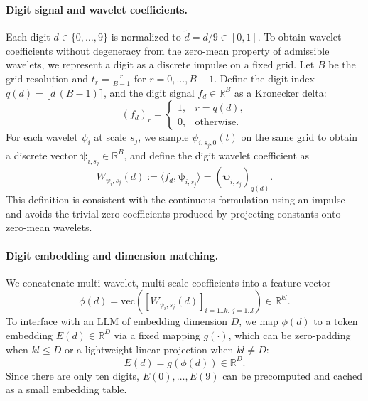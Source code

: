 \documentclass{article}
\begin{document}
\paragraph{Digit signal and wavelet coefficients.}
Each digit $d\in\{0,\ldots,9\}$ is normalized to $\tilde d = d/9 \in [0,1]$. To obtain wavelet coefficients without degeneracy from the zero-mean property of admissible wavelets, we represent a digit as a discrete impulse on a fixed grid.
Let $B$ be the grid resolution and $t_r=\frac{r}{B-1}$ for $r=0,\ldots,B-1$. Define the digit index $q(d)=\lfloor \tilde d\,(B-1) \rceil$, and the digit signal $f_d\in\mathbb{R}^{B}$ as a Kronecker delta:
\begin{equation}
(f_d)_r =
\begin{cases}
1, & r=q(d),\\
0, & \text{otherwise}.
\end{cases}
\label{eq:digit_onehot_main}
\end{equation}
For each wavelet $\psi_i$ at scale $s_j$, we sample $\psi_{i,s_j,0}(t)$ on the same grid to obtain a discrete vector $\boldsymbol{\psi}_{i,s_j}\in\mathbb{R}^{B}$, and define the digit wavelet coefficient as
\begin{equation}
W_{\psi_i,s_j}(d) := \langle f_d, \boldsymbol{\psi}_{i,s_j} \rangle = (\boldsymbol{\psi}_{i,s_j})_{q(d)}.
\label{eq:digit_wavelet_coeff_main}
\end{equation}
This definition is consistent with the continuous formulation using an impulse and avoids the trivial zero coefficients produced by projecting constants onto zero-mean wavelets.

\paragraph{Digit embedding and dimension matching.}
We concatenate multi-wavelet, multi-scale coefficients into a feature vector
\begin{equation}
\phi(d) = \mathrm{vec}\left(\left[W_{\psi_i,s_j}(d)\right]_{i=1..k,\, j=1..l}\right) \in \mathbb{R}^{kl}.
\label{eq:digit_feature_vec_main}
\end{equation}
To interface with an LLM of embedding dimension $D$, we map $\phi(d)$ to a token embedding $E(d)\in\mathbb{R}^{D}$ via a fixed mapping $g(\cdot)$, which can be zero-padding when $kl\le D$ or a lightweight linear projection when $kl\ne D$:
\begin{equation}
E(d) = g(\phi(d)) \in \mathbb{R}^{D}.
\label{eq:digit_embed_map_main}
\end{equation}
Since there are only ten digits, $E(0),\ldots,E(9)$ can be precomputed and cached as a small embedding table.
\end{document}

